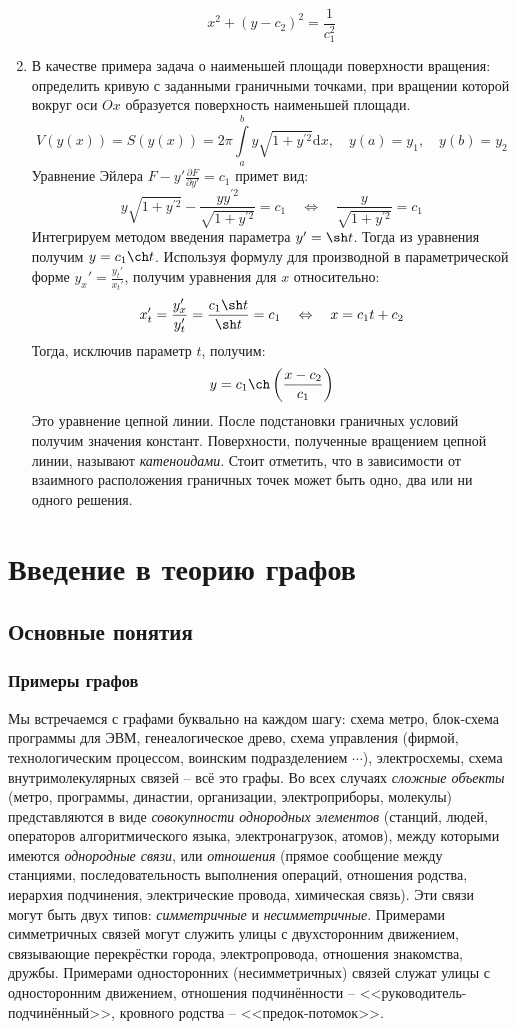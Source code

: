 \documentclass[12pt, a4paper]{article}
\newcommand{\di}{\mathrm{d}}
\begin{document}
\begin{enumerate}
 \[x^2 + (y-c_2)^2 = \frac{1}{c_1^2} \]
 \item В качестве примера задача о наименьшей площади поверхности вращения: определить кривую с заданными граничными точками, при вращении которой вокруг оси $Ox$ образуется поверхность наименьшей площади.
 \[V(y(x)) = S(y(x)) = 2\pi \int \limits_a^b y \sqrt{1 + y^{\prime 2}} \di x, \quad y(a) = y_1, \quad y(b) = y_2 \]
 Уравнение Эйлера $F - y' \frac{\partial F}{\partial y'} = c_1$ примет вид:
 \[y \sqrt{1 + y^{\prime 2}} - \frac{yy^{\prime 2}}{\sqrt{1 + y^{\prime 2}}} = c_1 \quad \Leftrightarrow \quad \frac{y}{\sqrt{1 + y^{\prime 2}}} = c_1 \]
 Интегрируем методом введения параметра $y' = \sh t$. Тогда из уравнения получим $y = c_1 \ch t$. Используя формулу для производной в параметрической форме $y_x' = \frac{y_t'}{x_t'}$, получим уравнения для $x$ относительно:
 \[x_t' = \frac{y_x'}{y_t'} = \frac{c_1 \sh t}{\sh t} = c_1 \quad \Leftrightarrow \quad x = c_1t + c_2 \]
 Тогда, исключив параметр $t$, получим:
 \[y = c_1 \ch \left( \frac{x-c_2}{c_1} \right) \]
 Это уравнение цепной линии. После подстановки граничных условий получим значения констант. Поверхности, полученные вращением цепной линии, называют \textit{катеноидами}. Стоит отметить, что в зависимости от взаимного расположения граничных точек может быть одно, два или ни одного решения.
\end{enumerate}

\section{Введение в теорию графов}

\subsection{Основные понятия}

\subsubsection{Примеры графов}

Мы встречаемся с графами буквально на каждом шагу: схема метро, блок-схема программы для ЭВМ, генеалогическое древо, схема управления (фирмой, технологическим процессом, воинским подразделением $\cdots$), электросхемы, схема внутримолекулярных связей -- всё это графы. Во всех случаях \textit{сложные объекты} (метро, программы, династии, организации, электроприборы, молекулы) представляются в виде \textit{совокупности однородных элементов} (станций, людей, операторов алгоритмического языка, электронагрузок, атомов), между которыми имеются \textit{однородные связи}, или \textit{отношения} (прямое сообщение между станциями, последовательность выполнения операций, отношения родства, иерархия подчинения, электрические провода, химическая связь). Эти связи могут быть двух типов: \textit{симметричные} и \textit{несимметричные}. Примерами симметричных связей могут служить улицы с двухсторонним движением, связывающие перекрёстки города, электропровода, отношения знакомства, дружбы. Примерами односторонних (несимметричных) связей служат улицы с односторонним движением, отношения подчинённости -- <<руководитель-подчинённый>>, кровного родства -- <<предок-потомок>>.
\end{document}
